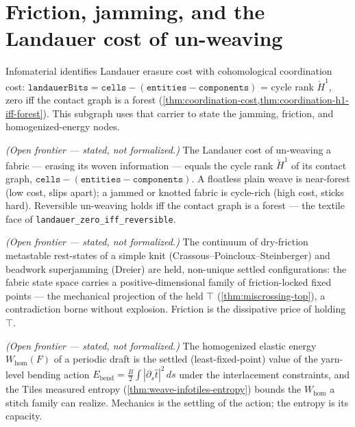 \section{Friction, jamming, and the Landauer cost of un-weaving}

Infomaterial identifies Landauer erasure cost with cohomological coordination cost:
$\texttt{landauerBits} = \texttt{cells} - (\texttt{entities} - \texttt{components})$ = cycle
rank $\check H^1$, zero iff the contact graph is a forest
(\cref{thm:coordination-cost,thm:coordination-h1-iff-forest}).  This subgraph
uses that carrier to state the jamming, friction, and homogenized-energy nodes.

\begin{theorem}\label{thm:unweaving-is-landauer}\notready{}
\emph{(Open frontier --- stated, not formalized.)} The Landauer cost of un-weaving a
fabric --- erasing its woven information --- equals the cycle rank $\check H^1$ of its
contact graph, $\texttt{cells} - (\texttt{entities} - \texttt{components})$. A floatless
plain weave is near-forest (low cost, slips apart); a jammed or knotted fabric is
cycle-rich (high cost, sticks hard). Reversible un-weaving holds iff the contact graph is a
forest --- the textile face of \texttt{landauer\_zero\_iff\_reversible}.
\end{theorem}

\begin{theorem}\label{thm:friction-metastability-held}\notready{}
\emph{(Open frontier --- stated, not formalized.)} The continuum of dry-friction
metastable rest-states of a simple knit (Crassous--Poincloux--Steinberger) and beadwork
superjamming (Dreier) are held, non-unique settled configurations: the fabric state space
carries a positive-dimensional family of friction-locked fixed points --- the mechanical
projection of the held $\top$ (\cref{thm:miscrossing-top}), a contradiction borne without
explosion. Friction is the dissipative price of holding $\top$.
\end{theorem}

\begin{theorem}\label{thm:homogenized-energy-settled}\notready{}
\emph{(Open frontier --- stated, not formalized.)} The homogenized elastic energy
$W_{\mathrm{hom}}(F)$ of a periodic draft is the settled (least-fixed-point) value of the
yarn-level bending action $E_{\mathrm{bend}} = \tfrac{B}{2}\int|\partial_s\hat t|^2\,ds$
under the interlacement constraints, and the Tiles measured entropy
(\cref{thm:weave-infotiles-entropy}) bounds the $W_{\mathrm{hom}}$ a stitch family can
realize. Mechanics is the settling of the action; the entropy is its capacity.
\end{theorem}
